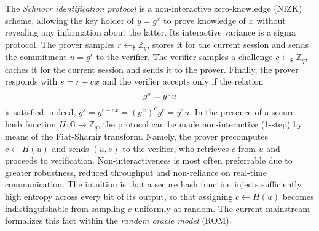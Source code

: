 \documentclass[psamsfonts, reqno]{amsart}
\theoremstyle{definition}
\theoremstyle{remark}
\numberwithin{equation}{section}
\begin{document}
The \textit{Schnorr identification protocol}
is a non-interactive zero-knowledge (NIZK) scheme,
allowing the key holder of $y = g ^ x$
to prove knowledge of $x$
without revealing any information about the latter.
Its interactive variance is a sigma protocol.
The prover samples $r \leftarrow_\$ \mathbb{Z}_q$,
stores it for the current session
and sends the commitment $u = g ^ r$ to the verifier.
The verifier samples a challenge $c \leftarrow_\$ \mathbb{Z}_q$,
caches it for the current session and sends it to the prover.
Finally, the prover responds with $s = r + c\hspace{1pt}x$
and the verifier accepts only if the relation
\vspace{5pt}
\begin{equation*}
g ^ s = y ^ c\hspace{1pt}u
\vspace{5pt}
\end{equation*}
is satisfied; indeed,
$g^s=g^{r + c\hspace{1pt}x}
=(g^{\hspace{1pt}x})^c\hspace{1pt}g^r
=y^c\hspace{1pt}u$.
In the presence of a secure hash function
$H: \mathbb{G} \rightarrow \mathbb{Z}_q$,
the protocol can be made non-interactive (1-step)
by means of the Fiat-Shamir transform. Namely,
the prover precomputes $c \leftarrow H(u)$
and sends $(u, s)$ to the verifier,
who retrieves $c$ from $u$ and proceeds
to verification.
Non-interactiveness is most often preferrable
due to greater robustness, reduced throughput
and non-reliance on real-time communication.
The intuition is that a secure hash function
injects sufficiently high entropy
across every bit of its output,
so that assigning $c \leftarrow H(u)$
becomes indistinguishable from sampling $c$ uniformly at random.
The current mainstream formalizes this fact
within the \textit{random oracle model} (ROM).
\end{document}
